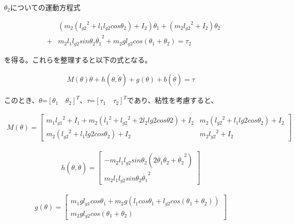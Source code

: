 $\theta_{2}$についての運動方程式

\begin{eqnarray}
  &&(m_{2}({l_{g2}}^2 + l_{1}l_{g2}cos\theta_{2}) + I_{2})\ddot{\theta_{1}} + (m_{2}{l_{g2}}^2 + I_{2})\ddot{\theta_{2}} \nonumber \\
  &+& m_{2}l_{1}l_{g2}sin\theta_{2}{\dot{\theta_{1}}}^2 + m_{2}gl_{g2}cos(\theta_{1} + \theta_{2}) = \tau_{2}
\end{eqnarray}

を得る。これらを整理すると以下の式となる。

\begin{eqnarray}
  M(\theta)\ddot{\theta} + h(\theta, \dot{\theta}) + g(\theta) + b(\dot{\theta}) = \tau
\end{eqnarray}

このとき、$\theta$=${[\theta_{1} \quad \theta_{2}]}^T$、$\tau$=${[\tau_{1} \quad \tau_{2}]}^T$であり、粘性を考慮すると、

\begin{align}
  M(\theta)= 
            \begin{bmatrix}
              m_{1}{l_{g1}}^2 + I_{1} + m_{2}({l_{1}}^2 + {l_{g2}}^2 + 2l_{2}l{g2}cos\theta{2}) + I_{2} & m_{2}({l_{g2}}^2 + l_{1}l{g2}cos\theta_{2}) + I_{2} \\
              m_{2}({l_{g2}}^2 + l_{1}l{g2}cos\theta_{2}) + I_{2} & m_{2}{l_{g2}}^2 + I_{2}
            \end{bmatrix}
\end{align}

\begin{eqnarray}
  h(\theta, \dot{\theta})=
            \begin{bmatrix}
              -m_{2}l_{1}l_{g2}sin\theta_{2}(2\dot{\theta_{1}}\dot{\theta_{2}} + {\dot{\theta_{2}}}^2) \\
              m_{2}l_{1}l_{g2}sin\theta_{2}{\dot{\theta_{1}}}^2
            \end{bmatrix}
\end{eqnarray}

\begin{eqnarray}
  g(\theta)=
            \begin{bmatrix}
              m_{1}gl_{g1}cos\theta_{1} + m_{2}g(l_{1}cos\theta_{1} + l_{g2}cos(\theta_{1} + \theta_{2})) \\
              m_{2}gl_{g2}cos(\theta_{1} + \theta_{2})
            \end{bmatrix}
\end{eqnarray}

